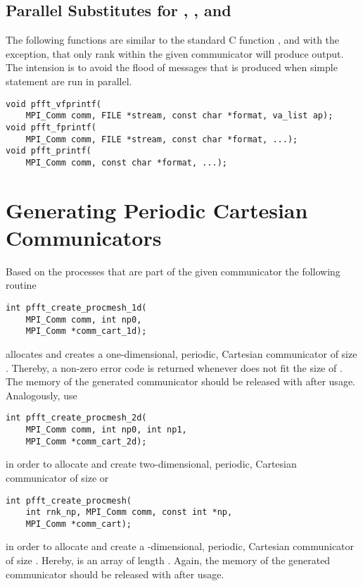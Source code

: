 \subsection{Parallel Substitutes for , , and }\label{sec:fprintf}
The following functions are similar to the standard C function ,  and  with the exception,
that only rank  within the given communicator  will produce output.
The intension is to avoid the flood of messages that is produced when simple  statement are run in parallel.
\begin{lstlisting}
void pfft_vfprintf(
    MPI_Comm comm, FILE *stream, const char *format, va_list ap);
void pfft_fprintf(
    MPI_Comm comm, FILE *stream, const char *format, ...);
void pfft_printf(
    MPI_Comm comm, const char *format, ...);
\end{lstlisting}

\section{Generating Periodic Cartesian Communicators}\label{sec:create-comm}

Based on the processes that are part of the given communicator  the following routine
\begin{lstlisting}
int pfft_create_procmesh_1d(
    MPI_Comm comm, int np0,
    MPI_Comm *comm_cart_1d);
\end{lstlisting}
allocates and creates a one-dimensional, periodic, Cartesian communicator  of size .
Thereby, a non-zero error code is returned whenever  does not fit the size of .
The memory of the generated communicator should be released with  after usage.
Analogously, use 
\begin{lstlisting}
int pfft_create_procmesh_2d(
    MPI_Comm comm, int np0, int np1,
    MPI_Comm *comm_cart_2d);
\end{lstlisting}
in order to allocate and create two-dimensional, periodic, Cartesian communicator  of size  or
\begin{lstlisting}
int pfft_create_procmesh(
    int rnk_np, MPI_Comm comm, const int *np,
    MPI_Comm *comm_cart);
\end{lstlisting}
in order to allocate and create a -dimensional, periodic, Cartesian communicator of size .
Hereby,  is an array of length .
Again, the memory of the generated communicator should be released with  after usage.



